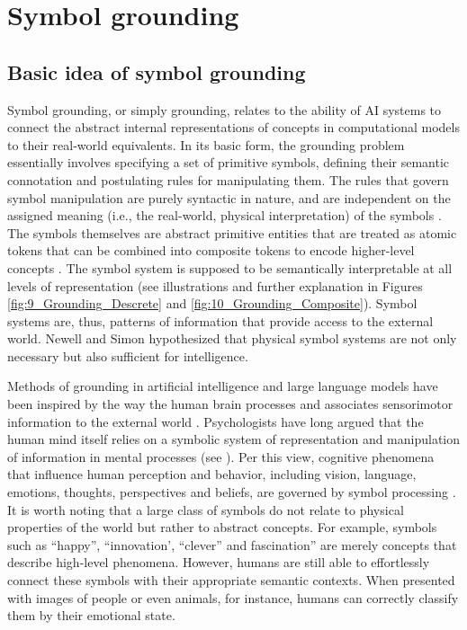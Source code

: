 \documentclass[10pt,journal,compsoc]{IEEEtran}
\begin{document}
	
	
	\section{Symbol grounding}
	
	\subsection{Basic idea of symbol grounding}
	Symbol grounding, or simply grounding, relates to the ability of AI systems to connect the abstract internal representations of concepts in computational models to their real-world equivalents. In its basic form, the grounding problem essentially involves specifying a set of primitive symbols, defining their semantic connotation and postulating rules for manipulating them. The rules that govern symbol manipulation are purely syntactic in nature, and are independent on the assigned meaning (i.e., the real-world, physical interpretation) of the symbols \cite{harnad1990symbol,vogt2002physical}. The symbols themselves are abstract primitive entities that are treated as atomic tokens that can be combined into composite tokens to encode higher-level concepts \cite{taddeo2005solving}. The symbol system is supposed to be semantically interpretable at all levels of representation \cite{harnad1990symbol} (see illustrations and further explanation in Figures \ref{fig:9_Grounding_Descrete} and \ref{fig:10_Grounding_Composite}). Symbol systems are, thus, patterns of information that provide access to the external world. Newell and Simon \cite{newell2007computer} hypothesized that physical symbol systems are not only necessary but also sufficient for intelligence.  

	
	
	Methods of grounding in artificial intelligence and large language models have been inspired by the way the human brain processes and associates sensorimotor information to the external world \cite{cangelosi2005approaches,macdorman1999grounding,pecher2011abstract, pylyshyn1980computation}. Psychologists have long argued that the human mind itself relies on a symbolic system of representation and manipulation of information in mental processes (see \cite{cangelosi2005approaches,pylyshyn1980computation,searle1980minds,fodor1983modularity,barsalou2008grounded}). Per this view, cognitive phenomena that influence human perception and behavior, including vision, language, emotions, thoughts, perspectives and beliefs, are governed by symbol processing \cite{fodor1980methodological,meins2013mind}. It is worth noting that a large class of symbols do not relate to physical properties of the world but rather to abstract concepts. For example, symbols such as “happy”, “innovation’, “clever” and fascination” are merely concepts that describe high-level phenomena. However, humans are still able to effortlessly connect these symbols with their appropriate semantic contexts. When presented with images of people or even animals, for instance, humans can correctly classify them by their emotional state.
	
\end{document}
